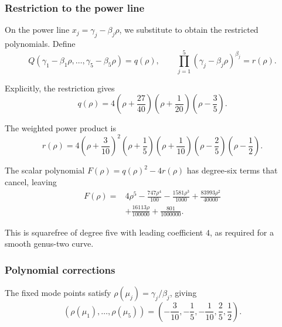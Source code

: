 \documentclass[11pt]{article}
\begin{document}
\subsubsection{Restriction to the power line}

On the power line $x_j = \gamma_j - \beta_j\rho$, we substitute to obtain the restricted polynomials. Define
\begin{equation}\label{ex:g2-restrictions}
Q(\gamma_1-\beta_1\rho,\ldots,\gamma_5-\beta_5\rho) = q(\rho), \qquad
\prod_{j=1}^{5} (\gamma_j-\beta_j\rho)^{\beta_j} = r(\rho).
\end{equation}

Explicitly, the restriction gives
\begin{equation}\label{ex:g2-q}
q(\rho) = 4\left(\rho + \frac{27}{40}\right)\left(\rho + \frac{1}{20}\right)\left(\rho - \frac{3}{5}\right).
\end{equation}

The weighted power product is
\begin{equation}\label{ex:g2-r}
r(\rho)=4\left(\rho + \frac{3}{10}\right)^{2}\left(\rho + \frac{1}{5}\right)\left(\rho + \frac{1}{10}\right)\left(\rho - \frac{2}{5}\right)\left(\rho - \frac{1}{2}\right).
\end{equation}

The scalar polynomial $F(\rho) = q(\rho)^2 - 4r(\rho)$ has degree-six terms that cancel, leaving
\begin{equation}\label{ex:g2-F}
\begin{aligned}F(\rho)={}&4 \rho^{5} - \frac{747 \rho^{4}}{100} - \frac{1581 \rho^{3}}{1000} + \frac{83993 \rho^{2}}{40000}\\&+ \frac{16113 \rho}{100000} + \frac{801}{1000000}.\end{aligned}
\end{equation}

This is squarefree of degree five with leading coefficient $4$, as required for a smooth genus-two curve.

\subsubsection{Polynomial corrections}

The fixed mode points satisfy $\rho(\mu_j) = \gamma_j/\beta_j$, giving
\[
(\rho(\mu_1),\ldots,\rho(\mu_5)) = \left(-\frac{3}{10},-\frac{1}{5},-\frac{1}{10},\frac{2}{5},\frac{1}{2}\right).
\]
\end{document}
